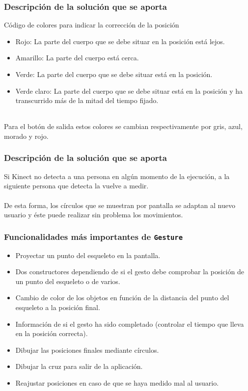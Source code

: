 \documentclass[leqno]{beamer}
\begin{document}
\begin{frame}
\frametitle{Descripción de la solución que se aporta}

\begin{block}{Código de colores para indicar la corrección de la posición}
\begin{itemize} 
\item Rojo: La parte del cuerpo que se debe situar en la posición está lejos.
\item Amarillo: La parte del cuerpo está cerca.
\item Verde: La parte del cuerpo que se debe situar está en la posición.
\item Verde claro: La parte del cuerpo que se debe situar está en la posición y ha transcurrido más de la mitad del tiempo fijado.
\end{itemize}
\end{block}
\textit{ }\\
Para el botón de salida estos colores se cambian respectivamente por gris, azul, morado y rojo.
\end{frame}

\begin{frame}
\frametitle{Descripción de la solución que se aporta}

Si Kinect no detecta a una persona en algún momento de la ejecución, a la siguiente persona que detecta la vuelve a medir.\\
\textit{ }\\
De esta forma, los círculos que se muestran por pantalla se adaptan al nuevo usuario y éste puede realizar sin problema los movimientos.
\end{frame}

\begin{frame}
\frametitle{Funcionalidades más importantes de \texttt{Gesture}}

\begin{itemize}
\item Proyectar un punto del esqueleto en la pantalla.
\item Dos constructores dependiendo de si el gesto debe comprobar la posición de un punto del esqueleto o de varios.
\item Cambio de color de los objetos en función de la distancia del punto del esqueleto a la posición final.
\item Información de si el gesto ha sido completado (controlar el tiempo que lleva en la posición correcta).
\item Dibujar las posiciones finales mediante círculos.
\item Dibujar la cruz para salir de la aplicación.
\item Reajustar posiciones en caso de que se haya medido mal al usuario.
\end{itemize}
\end{frame}
\end{document}

